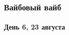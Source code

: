 \begin{frame}
	\frametitle{Вайбовый вайб}
	\framesubtitle{День 6, 23 августа}
	\centering
\end{frame}